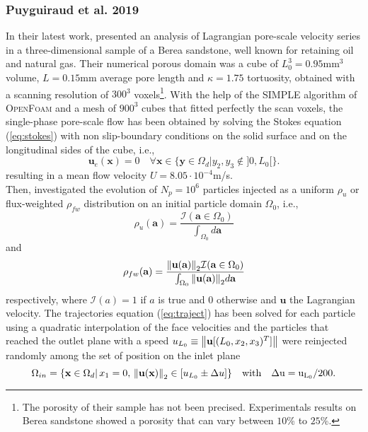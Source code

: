 \subsubsection{Puyguiraud et al. 2019}
In their latest work, \citet{Puyguiraud2019} presented an analysis of Lagrangian pore-scale velocity series in a three-dimensional sample of a Berea sandstone, well known for retaining oil and natural gas.
Their numerical porous domain was a cube of $L_0^3=0.95$mm$^3$ volume, $L=0.15$mm average pore length and $\kappa=1.75$ tortuosity, obtained with a scanning resolution of $300^3$ voxels\footnote{The porosity of their sample has not been precised. Experimentals results on Berea sandstone showed a porosity that can vary between $10$\% to $25$\%.}. 
With the help of the \textsc{SIMPLE} algorithm of \textsc{OpenFoam} and a mesh of $900^3$ cubes that fitted perfectly the scan voxels, the single-phase pore-scale flow has been obtained by solving the Stokes equation (\ref{eq:stokes}) with non slip-boundary conditions on the solid surface and on the longitudinal sides of the cube, i.e., 
\begin{equation}\label{eq:nonslip_sideBC}
\textbf{u}_e(\textbf{x})=0 \quad\forall \textbf{x}\in \{\textbf{y}\in\Omega_d|y_2,y_3\notin]0,L_0[\}.
\end{equation}
resulting in a mean flow velocity $U=8.05\cdot 10^{-4}$m/s.\\
Then, \citeauthor{Puyguiraud2019} investigated the evolution of $N_p=10^6$ particles injected as a uniform $\rho_u$ or flux-weighted $\rho_{fw}$ distribution on an initial particle domain $\Omega_0$, i.e.,
\begin{equation}\label{eq:unif_distr}
\rho_u(\textbf{a})=\frac{\mathcal{I}(\textbf{a}\in\Omega_0)}{\int_{\Omega_0} d\textbf{a}}
\end{equation}
and
\begin{equation}\label{eq:flux_weighted}
\rho_{fw}(\textbf{a})=\frac{\norm{\textbf{u}(\textbf{a})}_2\mathcal{I}(\textbf{a}\in\Omega_0)}{\int_{\Omega_0} \norm{\textbf{u}(\textbf{a})}_2 d\textbf{a}}
\end{equation}
respectively, where $\mathcal{I}(a)=1$ if $a$ is true and $0$ otherwise and $\textbf{u}$ the Lagrangian velocity. 
The trajectories equation (\ref{eq:traject}) has been solved for each particle using a quadratic interpolation of the face velocities and the particles that reached the outlet plane with a speed $u_{L_0}\equiv\norm{\textbf{u}[(L_0,x_2,x_3)^T]}$ were reinjected randomly among the set of position on the inlet plane
\[
\Omega_{in}=\{\textbf{x}\in\Omega_d|\,x_1=0,\,\norm{\textbf{u}(\textbf{x})}_2\in[u_{L_0}\pm\Delta u]\}\quad\rm{with}\quad \Delta u=u_{L_0}/200.
\]
